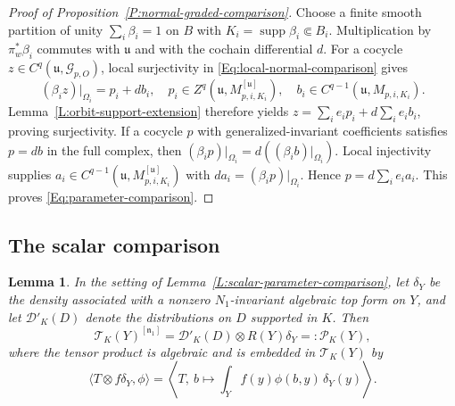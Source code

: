 \documentclass[a4paper,12pt]{amsart}
\numberwithin{equation}{section}
\theoremstyle{plain}
\newtheorem{lemma}[theorem]{Lemma}
\theoremstyle{definition}
\theoremstyle{remark}
\begin{document}
\begin{proof}[Proof of Proposition~\ref{P:normal-graded-comparison}]
Choose a finite smooth partition of unity $\sum_i\beta_i=1$ on $B$ with $K_i=\operatorname{supp}\beta_i\Subset B_i$.
Multiplication by $\pi_w^*\beta_i$ commutes with $\mathfrak u$ and with the cochain differential $d$.
For a cocycle $z\in C^q(\mathfrak u,\mathcal G_{p,O})$, local surjectivity in \eqref{Eq:local-normal-comparison} gives
\[
 (\beta_i z)|_{\Omega_i}=p_i+db_i,
 \quad p_i\in Z^q(\mathfrak u,M_{p,i,K_i}^{[\mathfrak u]}),
 \quad b_i\in C^{q-1}(\mathfrak u,M_{p,i,K_i}).
\]
Lemma~\ref{L:orbit-support-extension} therefore yields $z=\sum_i e_ip_i+d\sum_i e_ib_i$, proving surjectivity.
If a cocycle $p$ with generalized-invariant coefficients satisfies $p=db$ in the full complex, then $(\beta_ip)|_{\Omega_i}=d((\beta_ib)|_{\Omega_i})$.
Local injectivity supplies $a_i\in C^{q-1}(\mathfrak u,M_{p,i,K_i}^{[\mathfrak u]})$ with $da_i=(\beta_ip)|_{\Omega_i}$.
Hence $p=d\sum_i e_ia_i$.
This proves \eqref{Eq:parameter-comparison}.
\end{proof}

\subsection{The scalar comparison}\label{S:scalar-comparison}

\begin{lemma}\label{L:polynomial-parameters}
In the setting of Lemma~\ref{L:scalar-parameter-comparison}, let $\delta_Y$ be the density associated with a nonzero $N_1$-invariant algebraic top form on $Y$, and let $\mathcal D'_K(D)$ denote the distributions on $D$ supported in $K$.
Then
\begin{equation}\label{Eq:polynomial-parameters}
 \mathcal T_K(Y)^{[\mathfrak n_1]}
 =\mathcal D'_K(D)\otimes R(Y)\delta_Y
 =:\mathcal P_K(Y),
\end{equation}
where the tensor product is algebraic and is embedded in $\mathcal T_K(Y)$ by
\begin{equation}
 \langle T\otimes f\delta_Y,\phi\rangle
 =\left\langle T,\ b\longmapsto
          \int_Y f(y)\phi(b,y)\,\delta_Y(y)\right\rangle.
\end{equation}
\end{lemma}
\end{document}
